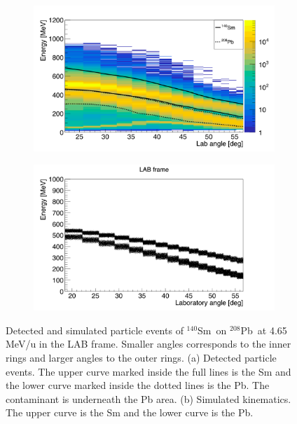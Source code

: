 \documentclass[twoside,english]{uiofysmaster/uiofysmaster}
\newcommand{\Sm}{$^{140}$Sm} %
\newcommand{\Pb}{$^{208}$Pb}
\begin{document}
\begin{figure}[htb]
	\centering
	\begin{subfigure}[t]{0.49\textwidth}
		\centering
		\includegraphics[width=\textwidth]{../Plots/plotting/particle-events-wcut.png}
		\caption{}
		\label{fig:part_wcut}
	\end{subfigure}
	\hfill 
	\begin{subfigure}[t]{0.49\textwidth}
		\centering
    		\includegraphics[width=\textwidth]{../Plots/simulation/kin_140Sm_208Pb.png}
		\caption{}
		\label{fig:kinsim}
	\end{subfigure}
	\caption{Detected and simulated particle events of \Sm\ on \Pb\ at 4.65 MeV/u in the LAB frame. Smaller angles corresponds to the inner rings and larger angles to the outer rings.
	(a) Detected particle events. The upper curve marked inside the full lines is the Sm and the lower curve marked inside the dotted lines is the Pb. The contaminant is underneath the Pb area. 	
	(b) Simulated kinematics. The upper curve is the Sm and the lower curve is the Pb.
	}
	\label{fig:part_events}
\end{figure}
\end{document}
